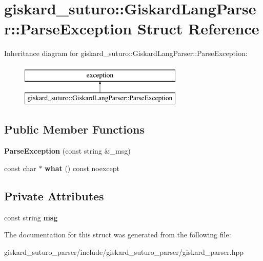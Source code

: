 \hypertarget{structgiskard__suturo_1_1GiskardLangParser_1_1ParseException}{\section{giskard\-\_\-suturo\-:\-:Giskard\-Lang\-Parser\-:\-:Parse\-Exception Struct Reference}
\label{structgiskard__suturo_1_1GiskardLangParser_1_1ParseException}
}
Inheritance diagram for giskard\-\_\-suturo\-:\-:Giskard\-Lang\-Parser\-:\-:Parse\-Exception\-:\begin{figure}[H]
\begin{center}
\leavevmode
\includegraphics[height=2.000000cm]{structgiskard__suturo_1_1GiskardLangParser_1_1ParseException}
\end{center}
\end{figure}
\subsection*{Public Member Functions}
\begin{DoxyCompactItemize}
\item 
\hypertarget{structgiskard__suturo_1_1GiskardLangParser_1_1ParseException_a35a4313f0b9f6ace6b33ee265ab3c8d8}{{\bfseries Parse\-Exception} (const string \&\-\_\-msg)}\label{structgiskard__suturo_1_1GiskardLangParser_1_1ParseException_a35a4313f0b9f6ace6b33ee265ab3c8d8}

\item 
\hypertarget{structgiskard__suturo_1_1GiskardLangParser_1_1ParseException_a50a25e0644a099970bde101b28c00261}{const char $\ast$ {\bfseries what} () const noexcept}\label{structgiskard__suturo_1_1GiskardLangParser_1_1ParseException_a50a25e0644a099970bde101b28c00261}

\end{DoxyCompactItemize}
\subsection*{Private Attributes}
\begin{DoxyCompactItemize}
\item 
\hypertarget{structgiskard__suturo_1_1GiskardLangParser_1_1ParseException_a2ae4425a5375bf32fd13e95cad65bbd1}{const string {\bfseries msg}}\label{structgiskard__suturo_1_1GiskardLangParser_1_1ParseException_a2ae4425a5375bf32fd13e95cad65bbd1}

\end{DoxyCompactItemize}


The documentation for this struct was generated from the following file\-:\begin{DoxyCompactItemize}
\item 
giskard\-\_\-suturo\-\_\-parser/include/giskard\-\_\-suturo\-\_\-parser/giskard\-\_\-parser.\-hpp\end{DoxyCompactItemize}
